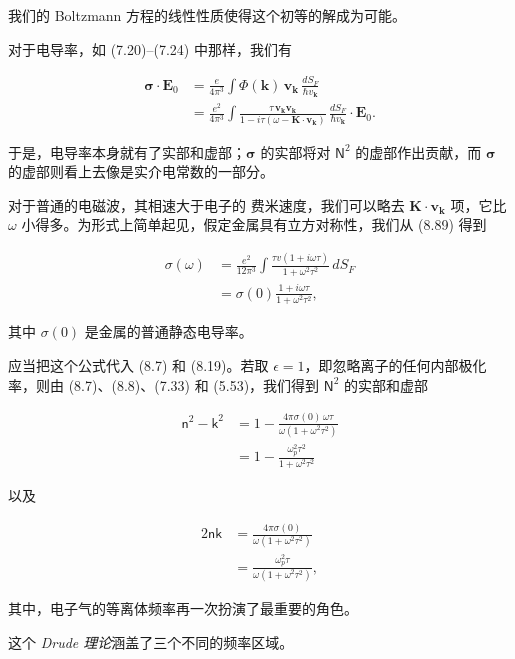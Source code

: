 我们的 Boltzmann 方程的线性性质使得这个初等的解成为可能。

对于电导率，如 (7.20)--(7.24) 中那样，我们有

\begin{align*}
\boldsymbol{\sigma}\cdot\mathbf{E}_0 &= \frac{e}{4\pi^3}\int \Phi(\mathbf{k})\,\mathbf{v}_{\mathbf{k}}\,\frac{dS_F}{\hbar v_{\mathbf{k}}} \\
&= \frac{e^2}{4\pi^3}\int \frac{\tau\,\mathbf{v}_{\mathbf{k}}\mathbf{v}_{\mathbf{k}}}{1-i\tau(\omega-\mathbf{K}\cdot\mathbf{v}_{\mathbf{k}})}\,\frac{dS_F}{\hbar v_{\mathbf{k}}}\cdot\mathbf{E}_0.
\tag{8.89}
\end{align*}

于是，电导率本身就有了实部和虚部；$\boldsymbol{\sigma}$ 的实部将对 $\mathsf{N}^2$ 的虚部作出贡献，而 $\boldsymbol{\sigma}$ 的虚部则看上去像是实介电常数的一部分。

对于普通的电磁波，其相速大于电子的 费米速度，我们可以略去 $\mathbf{K}\cdot\mathbf{v}_{\mathbf{k}}$ 项，它比 $\omega$ 小得多。为形式上简单起见，假定金属具有立方对称性，我们从 (8.89) 得到

\begin{align*}
\sigma(\omega) &= \frac{e^2}{12\pi^3}\int \frac{\tau v(1+i\omega\tau)}{1+\omega^2\tau^2}\,dS_F \\
&= \sigma(0)\frac{1+i\omega\tau}{1+\omega^2\tau^2},
\tag{8.90}
\end{align*}

其中 $\sigma(0)$ 是金属的普通静态电导率。

应当把这个公式代入 (8.7) 和 (8.19)。若取 $\epsilon=1$，即忽略离子的任何内部极化率，则由 (8.7)、(8.8)、(7.33) 和 (5.53)，我们得到 $\mathsf{N}^2$ 的实部和虚部

\begin{align*}
\mathsf{n}^2-\mathsf{k}^2 &= 1-\frac{4\pi\sigma(0)\,\omega\tau}{\omega(1+\omega^2\tau^2)} \\
&= 1-\frac{\omega_p^2\tau^2}{1+\omega^2\tau^2}
\tag{8.91}
\end{align*}

以及

\begin{align*}
2\mathsf{n}\mathsf{k} &= \frac{4\pi\sigma(0)}{\omega(1+\omega^2\tau^2)} \\
&= \frac{\omega_p^2\tau}{\omega(1+\omega^2\tau^2)},
\tag{8.92}
\end{align*}

其中，电子气的等离体频率再一次扮演了最重要的角色。

这个 \emph{Drude 理论}涵盖了三个不同的频率区域。


